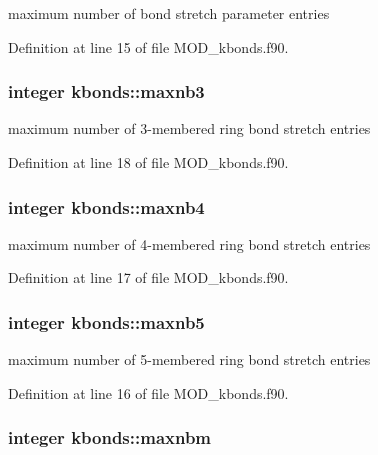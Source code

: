 maximum number of bond stretch parameter entries 



Definition at line 15 of file M\-O\-D\-\_\-kbonds.\-f90.

\hypertarget{classkbonds_aa8e2e75495d2bb801b4ee3410c933ba1}{
\subsubsection[{maxnb3}]{\setlength{\rightskip}{0pt plus 5cm}integer kbonds\-::maxnb3}}\label{classkbonds_aa8e2e75495d2bb801b4ee3410c933ba1}


maximum number of 3-\/membered ring bond stretch entries 



Definition at line 18 of file M\-O\-D\-\_\-kbonds.\-f90.

\hypertarget{classkbonds_a1146d8cd8643971889024141fc7b1278}{
\subsubsection[{maxnb4}]{\setlength{\rightskip}{0pt plus 5cm}integer kbonds\-::maxnb4}}\label{classkbonds_a1146d8cd8643971889024141fc7b1278}


maximum number of 4-\/membered ring bond stretch entries 



Definition at line 17 of file M\-O\-D\-\_\-kbonds.\-f90.

\hypertarget{classkbonds_ac0a19701e66f2ba2a514010e46f3e21f}{
\subsubsection[{maxnb5}]{\setlength{\rightskip}{0pt plus 5cm}integer kbonds\-::maxnb5}}\label{classkbonds_ac0a19701e66f2ba2a514010e46f3e21f}


maximum number of 5-\/membered ring bond stretch entries 



Definition at line 16 of file M\-O\-D\-\_\-kbonds.\-f90.

\hypertarget{classkbonds_a479b8df9e16642b87303fc1f3bd06d26}{
\subsubsection[{maxnbm}]{\setlength{\rightskip}{0pt plus 5cm}integer kbonds\-::maxnbm}}\label{classkbonds_a479b8df9e16642b87303fc1f3bd06d26}


